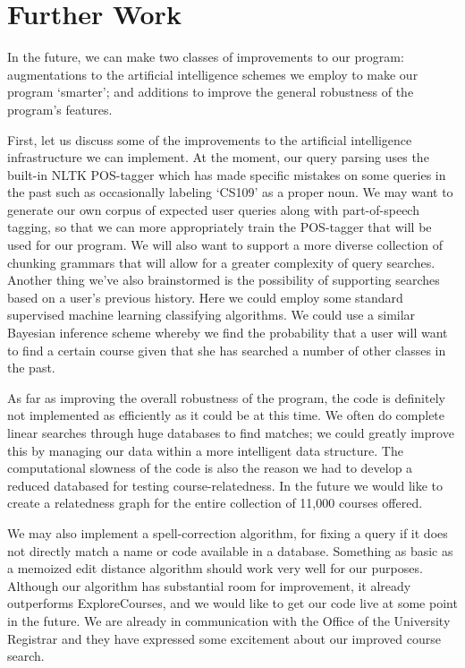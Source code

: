 \documentclass[12pt]{article}
\begin{document}
\section*{Further Work}

In the future, we can make two classes of improvements to our program:
augmentations to the artificial intelligence schemes we employ to make
our program `smarter'; and additions to improve the general robustness
of the program's features.

First, let us discuss some of the improvements to the artificial
intelligence infrastructure we can implement. At the moment, our query
parsing uses the built-in NLTK POS-tagger which has made specific
mistakes on some queries in the past such as occasionally labeling
`CS109' as a proper noun. We may want to generate our own corpus of
expected user queries along with part-of-speech tagging, so that we
can more appropriately train the POS-tagger that will be used for our
program. We will also want to support a more diverse collection of
chunking grammars that will allow for a greater complexity of query
searches. Another thing we've also brainstormed is the possibility of
supporting searches based on a user's previous history. Here we could
employ some standard supervised machine learning classifying
algorithms. We could use a similar Bayesian inference scheme whereby
we find the probability that a user will want to find a certain course
given that she has searched a number of other classes in the past.

As far as improving the overall robustness of the program, the code is
definitely not implemented as efficiently as it could be at this
time. We often do complete linear searches through huge databases to
find matches; we could greatly improve this by managing our data
within a more intelligent data structure. The computational slowness
of the code is also the reason we had to develop a reduced databased
for testing course-relatedness. In the future we would like to create
a relatedness graph for the entire collection of 11,000 courses
offered. 

We may also implement a spell-correction algorithm, for fixing a query
if it does not directly match a name or code available in a
database. Something as basic as a memoized edit distance algorithm
should work very well for our purposes. Although our algorithm has
substantial room for improvement, it already outperforms
ExploreCourses, and we would like to get our code live at some point
in the future. We are already in communication with the Office of the
University Registrar and they have expressed some excitement about our
improved course search.
\end{document}

